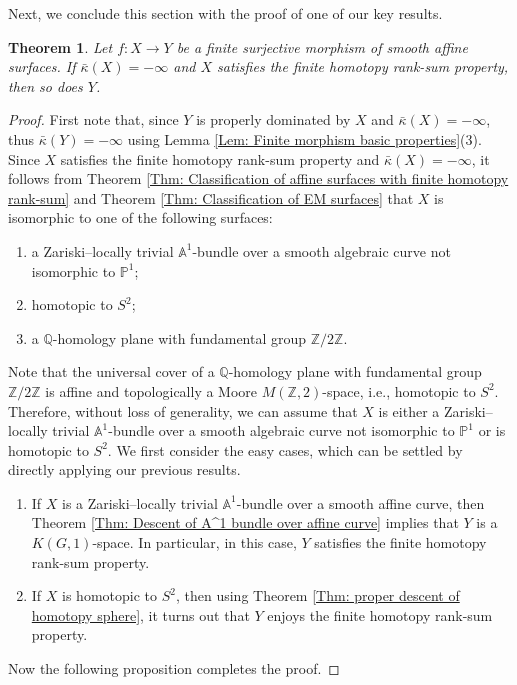 \documentclass[12pt,reqno,twoside]{amsart}
\newtheorem{theorem}{Theorem}[section]
\theoremstyle{definition}
\numberwithin{equation}{section}
\newcommand{\A}{\mathbb{A}}
\newcommand{\Q}{\mathbb{Q}}
\newcommand{\Z}{\mathbb{Z}}
\newcommand{\Kbar}{\bar{\kappa}}
\newcommand{\PP}{\mathbb{P}}
\begin{document}
Next, we conclude this section with the proof of one of our key results.

\begin{theorem}\label{Main Theorem - kappa bar negative case}
	Let $f \colon X \to Y$ be a finite surjective morphism of smooth affine surfaces. If $\Kbar(X)=-\infty$ and $X$ satisfies the finite homotopy rank-sum property, then so does $Y$.
\end{theorem}
\begin{proof}
    First note that, since $Y$ is properly dominated by $X$ and $\Kbar(X)=-\infty$, thus $\Kbar(Y)=-\infty$ using Lemma \ref{Lem: Finite morphism basic properties}(3). Since $X$ satisfies the finite homotopy rank-sum property and $\Kbar(X)=-\infty$, it follows from Theorem \ref{Thm: Classification of affine surfaces with finite homotopy rank-sum} and Theorem \ref{Thm: Classification of EM surfaces} that $X$ is isomorphic to one of the following surfaces:
    \begin{enumerate}[\indent\rm(1)]
        \item a Zariski--locally trivial $\A^1$-bundle over a smooth algebraic curve not isomorphic to $\PP^1$;
        \item homotopic to $S^2$;
        \item a $\Q$-homology plane with fundamental group $\Z/2\Z$.
    \end{enumerate}
Note that the universal cover of a $\Q$-homology plane with fundamental group $\Z/2\Z$ is affine and topologically a Moore $M(\Z,2)$-space, i.e., homotopic to $S^2$. Therefore, without loss of generality, we can assume that $X$ is either a Zariski--locally trivial $\A^1$-bundle over a smooth algebraic curve not isomorphic to $\PP^1$ or is homotopic to $S^2$. We first consider the easy cases, which can be settled by directly applying our previous results.

\begin{enumerate}[\indent---]
    \item If $X$ is a Zariski--locally trivial $\A^1$-bundle over a smooth affine curve, then Theorem \ref{Thm: Descent of A^1 bundle over affine curve} implies that $Y$ is a $K(G,1)$-space. In particular, in this case, $Y$ satisfies the finite homotopy rank-sum property.
    
    \item If $X$ is homotopic to $S^2$, then using Theorem \ref{Thm: proper descent of homotopy sphere}, it turns out that $Y$ enjoys the finite homotopy rank-sum property.
\end{enumerate}

Now the following proposition completes the proof.
\end{proof}
\end{document}
